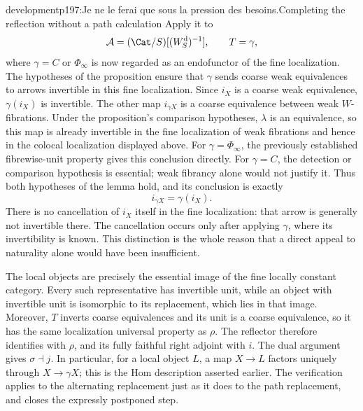 \begin{dcomment}{development}{p197:Je ne le ferai que sous la pression des besoins.}{Completing the reflection without a path calculation}
Apply it to
\[
\mathcal A=(\Cat/S)[(W_S^{\mathrm d})^{-1}],
\qquad T=\gamma,
\]
where $\gamma=C$ or $\Phi_\infty$ is now regarded as an endofunctor of the fine localization. The hypotheses of the proposition ensure that $\gamma$ sends coarse weak equivalences to arrows invertible in this fine localization. Since $i_X$ is a coarse weak equivalence, $\gamma(i_X)$ is invertible. The other map $i_{\gamma X}$ is a coarse equivalence between weak $W$-fibrations. Under the proposition's comparison hypotheses, $\lambda$ is an equivalence, so this map is already invertible in the fine localization of weak fibrations and hence in the colocal localization displayed above. For $\gamma=\Phi_\infty$, the previously established fibrewise-unit property gives this conclusion directly. For $\gamma=C$, the detection or comparison hypothesis is essential; weak fibrancy alone would not justify it. Thus both hypotheses of the lemma hold, and its conclusion is exactly
\[
i_{\gamma X}=\gamma(i_X).
\]
There is no cancellation of $i_X$ itself in the fine localization: that arrow is generally not invertible there. The cancellation occurs only after applying $\gamma$, where its invertibility is known. This distinction is the whole reason that a direct appeal to naturality alone would have been insufficient.

The local objects are precisely the essential image of the fine locally constant category. Every such representative has invertible unit, while an object with invertible unit is isomorphic to its replacement, which lies in that image. Moreover, $T$ inverts coarse equivalences and its unit is a coarse equivalence, so it has the same localization universal property as $\rho$. The reflector therefore identifies with $\rho$, and its fully faithful right adjoint with $i$. The dual argument gives $\sigma\dashv j$. In particular, for a local object $L$, a map $X\to L$ factors uniquely through $X\to\gamma X$; this is the Hom description asserted earlier. The verification applies to the alternating replacement just as it does to the path replacement, and closes the expressly postponed step.
\end{dcomment}

